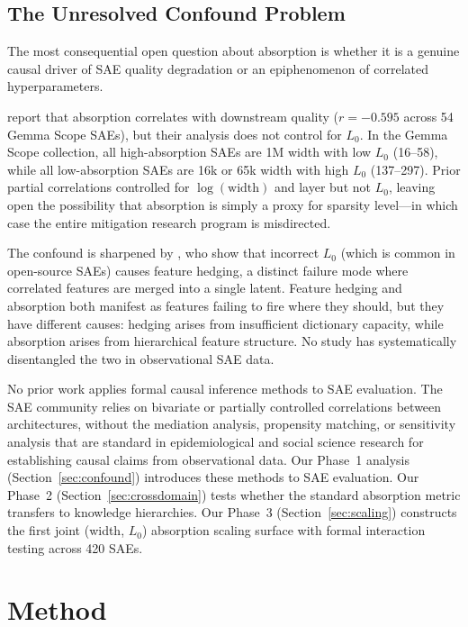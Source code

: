 \documentclass{article}
\begin{document}
\subsection{The Unresolved Confound Problem}

The most consequential open question about absorption is whether it is a genuine causal driver of SAE quality degradation or an epiphenomenon of correlated hyperparameters.

\citet{chanin2024absorption} report that absorption correlates with downstream quality ($r = -0.595$ across 54 Gemma Scope SAEs), but their analysis does not control for $L_0$.
In the Gemma Scope collection, all high-absorption SAEs are 1M width with low $L_0$ (16--58), while all low-absorption SAEs are 16k or 65k width with high $L_0$ (137--297).
Prior partial correlations controlled for $\log(\text{width})$ and layer but not $L_0$, leaving open the possibility that absorption is simply a proxy for sparsity level---in which case the entire mitigation research program is misdirected.

The confound is sharpened by \citet{chanin2025hedging}, who show that incorrect $L_0$ (which is common in open-source SAEs) causes feature hedging, a distinct failure mode where correlated features are merged into a single latent.
Feature hedging and absorption both manifest as features failing to fire where they should, but they have different causes: hedging arises from insufficient dictionary capacity, while absorption arises from hierarchical feature structure.
No study has systematically disentangled the two in observational SAE data.

No prior work applies formal causal inference methods to SAE evaluation.
The SAE community relies on bivariate or partially controlled correlations between architectures, without the mediation analysis, propensity matching, or sensitivity analysis that are standard in epidemiological and social science research for establishing causal claims from observational data.
Our Phase~1 analysis (Section~\ref{sec:confound}) introduces these methods to SAE evaluation.
Our Phase~2 (Section~\ref{sec:crossdomain}) tests whether the standard absorption metric transfers to knowledge hierarchies.
Our Phase~3 (Section~\ref{sec:scaling}) constructs the first joint (width, $L_0$) absorption scaling surface with formal interaction testing across 420 SAEs.

\section{Method}
\label{sec:method}
\end{document}
